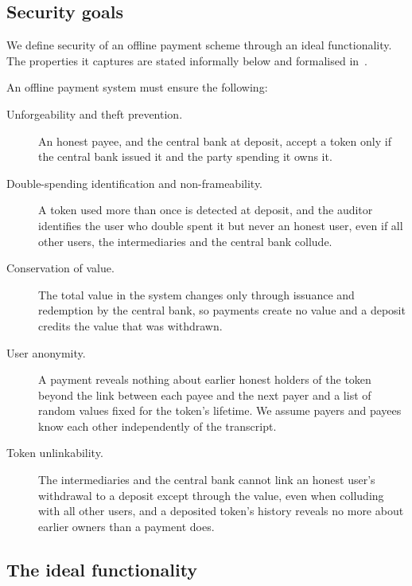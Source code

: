 \subsection{Security goals}

We define security of an offline payment scheme through an ideal
functionality. The properties it captures are stated
informally below and formalised in~.

An offline payment system must ensure the following:

\begin{description}

  \item[Unforgeability and theft prevention.] An honest payee, and the central
bank at deposit, accept a token only if the central bank issued it and the party
spending it owns it.

  \item[Double-spending identification and non-frameability.] A token used more
than once is detected at deposit, and the auditor identifies the user who double
spent it but never an honest user, even if all other users, the intermediaries
and the central bank collude.

  \item[Conservation of value.] The total value in the system changes only
through issuance and redemption by the central bank, so payments create no value
and a deposit credits the value that was withdrawn.

  \item[User anonymity.] A payment reveals nothing about earlier honest holders
of the token beyond the link between each payee and the next payer and a list
of random values fixed for the token's lifetime. We assume payers and payees
know each other independently of the transcript.

  \item[Token unlinkability.] The intermediaries and the central bank cannot link
an honest user's withdrawal to a deposit except through the value, even when
colluding with all other users, and a deposited token's history reveals no more
about earlier owners than a payment does.

\end{description}

\subsection{The ideal functionality}\label{sec:ideal-func}

